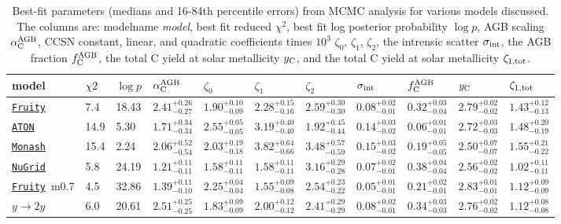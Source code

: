 \documentclass[fleqn,
referee, %
usenatbib]{mnras}
\newcommand{\fruity}{\texttt{\hyperlink{fruity}{Fruity}}}
\newcommand{\nugrid}{\texttt{\hyperlink{nugrid}{NuGrid}}}
\newcommand{\monash}{\texttt{\hyperlink{monash}{Monash}}}
\newcommand{\aton}{\texttt{\hyperlink{aton}{ATON}}}
\newcommand{\Yct}{{y_{\rm C}}}
\newcommand{\aagb}{\alpha_{\rm C}^{\rm AGB}}
\newcommand{\fagb}{f_{\rm C}^{\rm AGB}}
\newcommand{\zetao}{\zeta_0}
\newcommand{\zetai}{\zeta_{1}}
\newcommand{\zetaii}{\zeta_{2}}
\begin{document}
\begin{table}
    \caption{
        Best-fit parameters (medians and 16-84th percentile errors) from MCMC analysis for various models discussed.
        The columns are:  modelname \textit{model}, best fit reduced $\chi^2$, best fit log posterior probability $\log p$, AGB scaling $\aagb$, CCSN constant, linear, and quadratic coefficients times $10^3$ $\zetao$, $\zetai$, $\zetaii$, the intrensic scatter $\sigma_{\rm int}$, the AGB fraction $\fagb$, the total C yield at solar metallicity $\Yct$, and the total C yield at solar metallicity $\zeta_{\rm 1, tot}$.
    }
    \label{tab:mcmc_results}

{ 
\renewcommand{\baselinestretch}{1.2}
    \begin{tabular}{l l l l l l l l l l l} 
    \hline
    model            & $\chi2$  & $\log p$ & $\aagb$ & $\zetao$ & $\zetai$ & $\zetaii$ & $\sigma_{\rm int}$ & $\fagb$ & $\Yct$ & $\zeta_{\rm 1, tot}$\\
\hline
\fruity          &      7.4 &    18.43 & $2.41^{+0.26}_{-0.27}$  &  $1.90^{+0.10}_{-0.09}$  &  $2.28^{+0.15}_{-0.16}$  &  $2.59^{+0.30}_{-0.30}$  &  $0.08^{+0.02}_{-0.01}$  &  $0.32^{+0.03}_{-0.04}$  &  $2.79^{+0.02}_{-0.02}$  &  $1.43^{+0.12}_{-0.13}$\\ 
\aton            &     14.9 &     5.30 & $1.71^{+0.34}_{-0.34}$  &  $2.55^{+0.05}_{-0.05}$  &  $3.19^{+0.40}_{-0.40}$  &  $1.92^{+0.45}_{-0.44}$  &  $0.14^{+0.03}_{-0.02}$  &  $0.06^{+0.01}_{-0.01}$  &  $2.72^{+0.03}_{-0.03}$  &  $1.48^{+0.20}_{-0.19}$\\ 
\monash          &     15.4 &     2.24 & $2.06^{+0.52}_{-0.54}$  &  $2.03^{+0.19}_{-0.18}$  &  $3.82^{+0.64}_{-0.66}$  &  $3.48^{+0.57}_{-0.59}$  &  $0.15^{+0.03}_{-0.02}$  &  $0.19^{+0.05}_{-0.05}$  &  $2.50^{+0.07}_{-0.07}$  &  $1.55^{+0.21}_{-0.22}$\\ 
\nugrid          &      5.8 &    24.19 & $1.21^{+0.11}_{-0.11}$  &  $1.58^{+0.11}_{-0.11}$  &  $1.58^{+0.11}_{-0.11}$  &  $3.16^{+0.29}_{-0.28}$  &  $0.07^{+0.02}_{-0.01}$  &  $0.38^{+0.04}_{-0.04}$  &  $2.56^{+0.02}_{-0.02}$  &  $1.02^{+0.11}_{-0.11}$\\ 
\fruity\ m0.7    &      4.5 &    32.86 & $1.39^{+0.11}_{-0.10}$  &  $2.25^{+0.04}_{-0.04}$  &  $1.55^{+0.09}_{-0.08}$  &  $2.54^{+0.23}_{-0.22}$  &  $0.05^{+0.01}_{-0.01}$  &  $0.21^{+0.02}_{-0.01}$  &  $2.83^{+0.01}_{-0.01}$  &  $1.12^{+0.09}_{-0.09}$\\ 
$y\rightarrow 2y$ &      6.0 &    20.61 & $2.51^{+0.25}_{-0.25}$  &  $1.83^{+0.09}_{-0.09}$  &  $2.00^{+0.12}_{-0.12}$  &  $2.41^{+0.29}_{-0.29}$  &  $0.08^{+0.02}_{-0.01}$  &  $0.34^{+0.03}_{-0.03}$  &  $2.76^{+0.02}_{-0.02}$  &  $1.12^{+0.08}_{-0.08}$\\ 

\end{tabular}}
\end{table}
\end{document}
